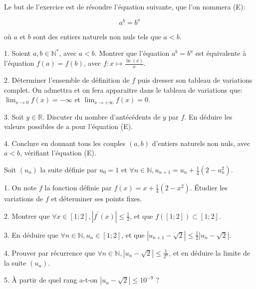 \documentclass[a4paper, 11pt,reqno]{article}
\begin{document}
\begin{exercice}
Le but de l'exercice est de résoudre l'équation suivante, que l'on nommera (E):

$$
a^{b}=b^{a}
$$

où $a$ et $b$ sont des entiers naturels non nuls tels que $a<b$.

1. Soient $a, b \in \mathbb{N}^{*}$, avec $a<b$. Montrer que l'équation $a^{b}=b^{a}$ est équivalente à l'équation $f(a)=f(b)$, avec $f: x \longmapsto \frac{\ln (x)}{x} .$

2. Déterminer l'ensemble de définition de $f$ puis dresser son tableau de variations complet. On admettra et on fera apparaitre dans le tableau de variations que: $\lim _{x \rightarrow 0} f(x)=-\infty$ et $\lim _{x \rightarrow+\infty} f(x)=0$.

3. Soit $y \in \mathbb{R}$. Discuter du nombre d'antécédents de $y$ par $f$. En déduire les valeurs possibles de a pour l'équation (E).

4. Conclure en donnant tous les couples $(a, b)$ d'entiers naturels non nuls, avec $a<b$, vérifiant l'équation (E).

\end{exercice}





\begin{exercice}
Soit $\left(u_{n}\right)$ la suite définie par $u_{0}=1$ et $\forall n \in \mathbb{N}, u_{n+1}=u_{n}+\frac{1}{4}\left(2-u_{n}^{2}\right)$.

1. On note $f$ la fonction définie par $f(x)=x+\frac{1}{4}\left(2-x^{2}\right)$. Étudier les variations de $f$ et déterminer ses points fixes.

2. Montrer que $\forall x \in[1 ; 2],\left|f^{\prime}(x)\right| \leq \frac{1}{2}$, et que $f([1 ; 2]) \subset[1 ; 2]$.

3. En déduire que $\forall n \in \mathbb{N}, u_{n} \in[1 ; 2]$, et que $\left|u_{n+1}-\sqrt{2}\right| \leq \frac{1}{2}\left|u_{n}-\sqrt{2}\right|$.

4. Prouver par récurrence que $\forall n \in \mathbb{N},\left|u_{n}-\sqrt{2}\right| \leq \frac{1}{2^{n}}$, et en déduire la limite de la suite $\left(u_{n}\right)$.

5. À partir de quel rang a-t-on $\left|u_{n}-\sqrt{2}\right| \leq 10^{-9}$ ?

\end{exercice}
\end{document}
